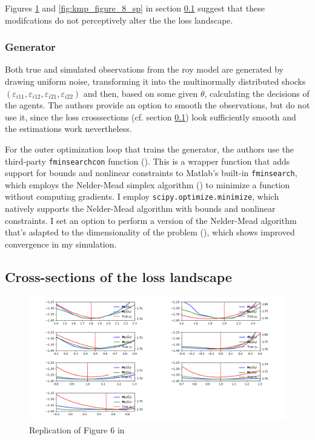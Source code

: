 Figures \ref{fig:kmp_figure_6} and \ref{fig:kmp_figure_8_sp} in section \ref{sec:cross_loss} suggest that these modifcations do not perceptively alter the the loss landscape.

\subsubsection{Generator}

Both true and simulated observations from the roy model are generated by drawing uniform noise, transforming it into the multinormally distributed shocks $(\varepsilon_{i 11}, \varepsilon_{i 12}, \varepsilon_{i 21}, \varepsilon_{i 22})$ and then, based on some given $\theta$, calculating the decisions of the agents.
The authors provide an option to smooth the observations, but do not use it, since the loss crosssections (cf. section \ref{sec:cross_loss}) look sufficiently smooth and the estimations work nevertheless.

For the outer optimization loop that trains the generator, the authors use the third-party \mbox{\texttt{fminsearchcon}} function (\textcite{DErrico2024}).
This is a wrapper function that adds support for bounds and nonlinear constraints to Matlab's built-in \texttt{fminsearch}, which employs the Nelder-Mead simplex algorithm (\textcite{lagarias1998convergence}) to minimize a function without computing gradients.
I employ \texttt{scipy.optimize.minimize}, which natively supports the Nelder-Mead algorithm with bounds and nonlinear constraints.
I set an option to perform a version of the Nelder-Mead algorithm that's adapted to the dimensionality of the problem (\cite{gao2012implementing}), which shows improved convergence in my simulation. %

\subsection{Cross-sections of the loss landscape}
\label{sec:cross_loss}

\begin{figure}
    \includegraphics[width=\textwidth]{./Images/kmp_figure_6.png}
    \caption{Replication of Figure 6 in \cite{kaji2023adversarial}}
    \label{fig:kmp_figure_6}
\end{figure}


